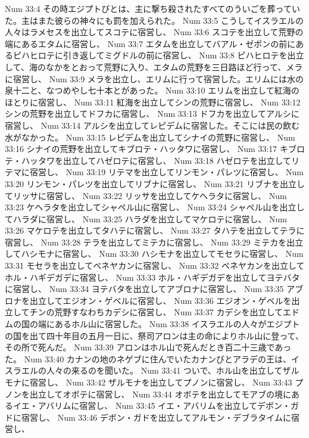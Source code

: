 Num 33:4  その時エジプトびとは、主に撃ち殺されたすべてのういごを葬っていた。主はまた彼らの神々にも罰を加えられた。
Num 33:5  こうしてイスラエルの人々はラメセスを出立してスコテに宿営し、
Num 33:6  スコテを出立して荒野の端にあるエタムに宿営し、
Num 33:7  エタムを出立してバアル・ゼポンの前にあるピハヒロテに引き返してミグドルの前に宿営し、
Num 33:8  ピハヒロテを出立して、海のなかをとおって荒野に入り、エタムの荒野を三日路ほど行って、メラに宿営し、
Num 33:9  メラを出立し、エリムに行って宿営した。エリムには水の泉十二と、なつめやし七十本とがあった。
Num 33:10  エリムを出立して紅海のほとりに宿営し、
Num 33:11  紅海を出立してシンの荒野に宿営し、
Num 33:12  シンの荒野を出立してドフカに宿営し、
Num 33:13  ドフカを出立してアルシに宿営し、
Num 33:14  アルシを出立してレピデムに宿営した。そこには民の飲む水がなかった。
Num 33:15  レピデムを出立してシナイの荒野に宿営し、
Num 33:16  シナイの荒野を出立してキブロテ・ハッタワに宿営し、
Num 33:17  キブロテ・ハッタワを出立してハゼロテに宿営し、
Num 33:18  ハゼロテを出立してリテマに宿営し、
Num 33:19  リテマを出立してリンモン・パレツに宿営し、
Num 33:20  リンモン・パレツを出立してリブナに宿営し、
Num 33:21  リブナを出立してリッサに宿営し、
Num 33:22  リッサを出立してケヘラタに宿営し、
Num 33:23  ケヘラタを出立してシャペル山に宿営し、
Num 33:24  シャペル山を出立してハラダに宿営し、
Num 33:25  ハラダを出立してマケロテに宿営し、
Num 33:26  マケロテを出立してタハテに宿営し、
Num 33:27  タハテを出立してテラに宿営し、
Num 33:28  テラを出立してミテカに宿営し、
Num 33:29  ミテカを出立してハシモナに宿営し、
Num 33:30  ハシモナを出立してモセラに宿営し、
Num 33:31  モセラを出立してベネヤカンに宿営し、
Num 33:32  ベネヤカンを出立してホル・ハギデガデに宿営し、
Num 33:33  ホル・ハギデガデを出立してヨテバタに宿営し、
Num 33:34  ヨテバタを出立してアブロナに宿営し、
Num 33:35  アブロナを出立してエジオン・ゲベルに宿営し、
Num 33:36  エジオン・ゲベルを出立してチンの荒野すなわちカデシに宿営し、
Num 33:37  カデシを出立してエドムの国の端にあるホル山に宿営した。
Num 33:38  イスラエルの人々がエジプトの国を出て四十年目の五月一日に、祭司アロンは主の命によりホル山に登って、その所で死んだ。
Num 33:39  アロンはホル山で死んだとき百二十三歳であった。
Num 33:40  カナンの地のネゲブに住んでいたカナンびとアラデの王は、イスラエルの人々の来るのを聞いた。
Num 33:41  ついで、ホル山を出立してザルモナに宿営し、
Num 33:42  ザルモナを出立してプノンに宿営し、
Num 33:43  プノンを出立してオボテに宿営し、
Num 33:44  オボテを出立してモアブの境にあるイエ・アバリムに宿営し、
Num 33:45  イエ・アバリムを出立してデボン・ガドに宿営し、
Num 33:46  デボン・ガドを出立してアルモン・デブラタイムに宿営し、
